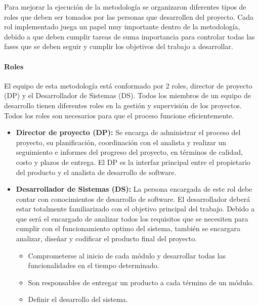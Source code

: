 Para mejorar la ejecución de la metodología se organizaron diferentes tipos de roles que deben ser tomados por las personas que desarrollen del proyecto. Cada rol implementado juega un papel muy importante dentro de la metodología, debido a que deben cumplir tareas de suma importancia para controlar todas las fases que se deben seguir y cumplir los objetivos del trabajo a desarrollar.

\paragraph{Roles}

El equipo de esta metodología está conformado por 2 roles, director de proyecto (DP) y el Desarrollador de Sistemas (DS). Todos los miembros de un equipo de desarrollo tienen diferentes roles en la gestión y supervisión de los proyectos. Todos los roles son necesarios para que el proceso funcione eficientemente.

\begin{itemize}
	\item \textbf{Director de proyecto (DP):} Se encarga de administrar el proceso del proyecto, su planificación, coordinación con el analista y realizar un seguimiento e informes del progreso del proyecto, en términos de calidad, costo y plazos de entrega. El DP es la interfaz principal entre el propietario del producto y el analista de desarrollo de software.
	
	\item \textbf{Desarrollador de Sistemas (DS):} La persona encargada de este rol debe contar con conocimientos de desarrollo de software. El desarrollador deberá estar totalmente familiarizado con el objetivo principal del trabajo. Debido a que será el encargado de analizar todos los requisitos que se necesiten para cumplir con el funcionamiento optimo del sistema, también se encargara analizar, diseñar y codificar el producto final del proyecto.
	
	\begin{itemize}
		\item Comprometerse al inicio de cada módulo y desarrollar todas las funcionalidades en el tiempo determinado.
		
		\item Son responsables de entregar un producto a cada término de un módulo.
		
		\item Definir el desarrollo del sistema.
	\end{itemize} 
\end{itemize}

